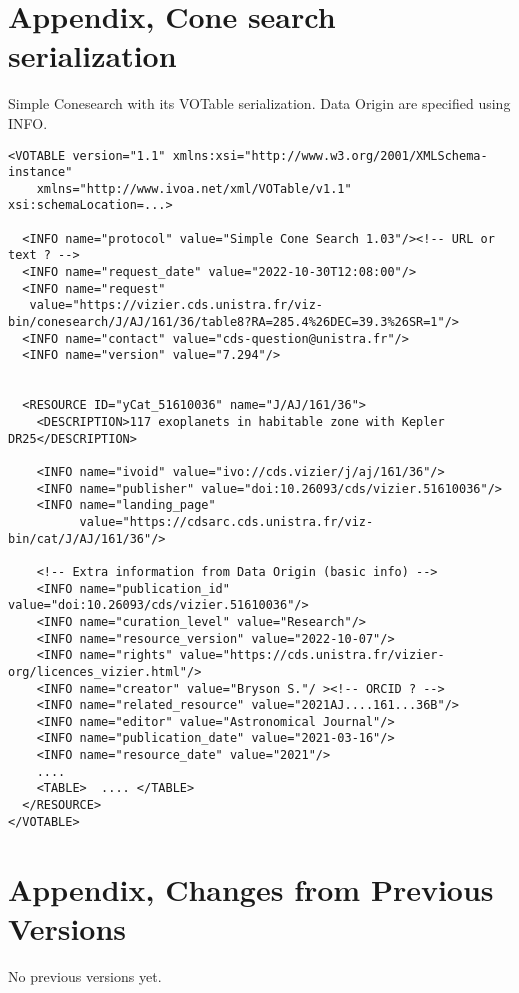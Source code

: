 \documentclass[11pt,a4paper]{ivoa}
\begin{document}
\section{Appendix, Cone search serialization}\label{appendixA}
Simple Conesearch with its VOTable serialization. Data Origin are specified using  INFO.
\begin{verbatim}
<VOTABLE version="1.1" xmlns:xsi="http://www.w3.org/2001/XMLSchema-instance"
    xmlns="http://www.ivoa.net/xml/VOTable/v1.1" xsi:schemaLocation=...>

  <INFO name="protocol" value="Simple Cone Search 1.03"/><!-- URL or text ? -->
  <INFO name="request_date" value="2022-10-30T12:08:00"/>
  <INFO name="request"
   value="https://vizier.cds.unistra.fr/viz-bin/conesearch/J/AJ/161/36/table8?RA=285.4%26DEC=39.3%26SR=1"/>
  <INFO name="contact" value="cds-question@unistra.fr"/>
  <INFO name="version" value="7.294"/>


  <RESOURCE ID="yCat_51610036" name="J/AJ/161/36">
    <DESCRIPTION>117 exoplanets in habitable zone with Kepler DR25</DESCRIPTION>

    <INFO name="ivoid" value="ivo://cds.vizier/j/aj/161/36"/>
    <INFO name="publisher" value="doi:10.26093/cds/vizier.51610036"/>
    <INFO name="landing_page"
          value="https://cdsarc.cds.unistra.fr/viz-bin/cat/J/AJ/161/36"/>

    <!-- Extra information from Data Origin (basic info) -->
    <INFO name="publication_id" value="doi:10.26093/cds/vizier.51610036"/>
    <INFO name="curation_level" value="Research"/>
    <INFO name="resource_version" value="2022-10-07"/>
    <INFO name="rights" value="https://cds.unistra.fr/vizier-org/licences_vizier.html"/>
    <INFO name="creator" value="Bryson S."/ ><!-- ORCID ? -->
    <INFO name="related_resource" value="2021AJ....161...36B"/>
    <INFO name="editor" value="Astronomical Journal"/>
    <INFO name="publication_date" value="2021-03-16"/>
    <INFO name="resource_date" value="2021"/>
    ....
    <TABLE>  .... </TABLE>
  </RESOURCE>
</VOTABLE>
\end{verbatim}

\section{Appendix, Changes from Previous Versions}

No previous versions yet.



\end{document}
